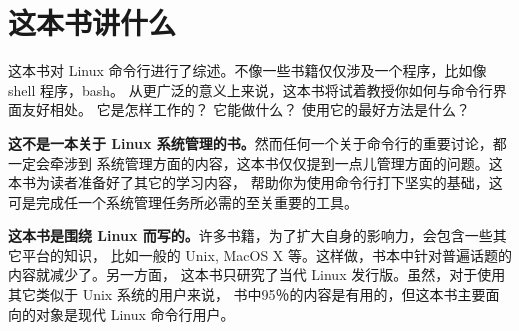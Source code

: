 \section{这本书讲什么} %
\label{sec:这本书讲什么}

这本书对 Linux 命令行进行了综述。不像一些书籍仅仅涉及一个程序，比如像 shell 程序，bash。 从更广泛的意义上来说，这本书将试着教授你如何与命令行界面友好相处。 它是怎样工作的？ 它能做什么？ 使用它的最好方法是什么？

\textbf{这不是一本关于 Linux 系统管理的书。}然而任何一个关于命令行的重要讨论，都一定会牵涉到 系统管理方面的内容，这本书仅仅提到一点儿管理方面的问题。这本书为读者准备好了其它的学习内容， 帮助你为使用命令行打下坚实的基础，这可是完成任一个系统管理任务所必需的至关重要的工具。

\textbf{这本书是围绕 Linux 而写的。}许多书籍，为了扩大自身的影响力，会包含一些其它平台的知识， 比如一般的 Unix, MacOS X 等。这样做，书本中针对普遍话题的内容就减少了。另一方面， 这本书只研究了当代 Linux 发行版。虽然，对于使用其它类似于 Unix 系统的用户来说， 书中95％的内容是有用的，但这本书主要面向的对象是现代 Linux 命令行用户。
